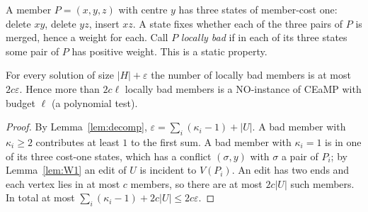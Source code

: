 A member $P=(x,y,z)$ with centre $y$ has three states of member-cost one: delete $xy$, delete $yz$, insert $xz$. A state fixes whether each of the three pairs of $P$ is merged, hence a weight for each. Call $P$ \emph{locally bad} if in each of its three states some pair of $P$ has positive weight. This is a static property.
\begin{lemma}\label{lem:BAD}
For every solution of size $|H|+\varepsilon$ the number of locally bad members is at most $2c\varepsilon$. Hence more than $2c\ell$ locally bad members is a NO-instance of CEaMP with budget $\ell$ (a polynomial test).
\end{lemma}
\begin{proof}
By Lemma~\ref{lem:decomp}, $\varepsilon=\sum_i(\kappa_i-1)+|U|$. A bad member with $\kappa_i\ge2$ contributes at least $1$ to the first sum. A bad member with $\kappa_i=1$ is in one of its three cost-one states, which has a conflict $(\sigma,y)$ with $\sigma$ a pair of $P_i$; by Lemma~\ref{lem:W1} an edit of $U$ is incident to $V(P_i)$. An edit has two ends and each vertex lies in at most $c$ members, so there are at most $2c|U|$ such members. In total at most $\sum_i(\kappa_i-1)+2c|U|\le2c\varepsilon$.
\end{proof}

